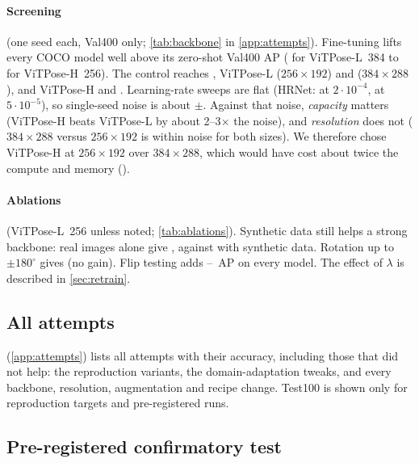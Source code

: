 \paragraph{Screening} (one seed each, Val400 only; \cref{tab:backbone} in \cref{app:attempts}).
Fine-tuning lifts every COCO model well above its zero-shot Val400 AP ( for ViTPose-L~384 to  for ViTPose-H~256). The control reaches , ViTPose-L  ($256{\times}192$) and  ($384{\times}288$), and ViTPose-H  and . Learning-rate sweeps are flat (HRNet:  at $2{\cdot}10^{-4}$,  at $5{\cdot}10^{-5}$), so single-seed noise is about $\pm$.
Against that noise, \emph{capacity} matters (ViTPose-H beats ViTPose-L by about 2--3$\times$ the noise), and \emph{resolution} does not ($384{\times}288$ versus $256{\times}192$ is within noise for both sizes).
We therefore chose ViTPose-H at $256{\times}192$ over $384{\times}288$, which would have cost about twice the compute and memory ().

\paragraph{Ablations} (ViTPose-L~256 unless noted; \cref{tab:ablations}).
Synthetic data still helps a strong backbone: real images alone give , against  with synthetic data. Rotation up to $\pm180^\circ$ gives  (no gain). Flip testing adds --~AP on every model. The effect of $\lambda$ is described in \cref{sec:retrain}.

\subsection{All attempts}\label{sec:attempts}

 (\cref{app:attempts}) lists all  attempts with their accuracy, including those that did not help: the reproduction variants, the domain-adaptation tweaks, and every backbone, resolution, augmentation and recipe change. Test100 is shown only for reproduction targets and pre-registered runs.


\subsection{Pre-registered confirmatory test}\label{sec:final}


